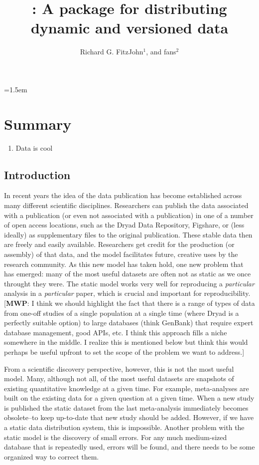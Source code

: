 \documentclass[a4paper,11pt]{article}
\title{{\livingdata}: A package for distributing dynamic and versioned
data}
\author{Richard G. FitzJohn$^1$, and fans$^2$}
\affiliation{
$^1$ Somewhere in the UK\\
$^2$ Everywhere else\\

}
\date{}
\begin{document}
\mstitlepage
\noindent
\parindent=1.5em
\addtolength{\parskip}{.3em}
\doublespacing
\linenumbers
\section{Summary}
\begin{enumerate}
\def\labelenumi{\arabic{enumi}.}
\itemsep1pt\parskip0pt
\item Data is cool
\end{enumerate}

\subsection{Introduction}

In recent years the idea of the data publication has become established
across many different scientific disciplines. Researchers can publish
the data associated with a publication (or even not associated with a
publication) in one of a number of open access locations, such as the
Dryad Data Repository, Figshare, or (less ideally) as supplementary
files to the original publication. These stable data then are freely and
easily available. Researchers get credit for the production (or
assembly) of that data, and the model facilitates future, creative uses
by the research community. As this new model has taken hold, one new
problem that has emerged: many of the most useful datasets are often not
as static as we once throught they were. The static model works very
well for reproducing a \emph{particular} analysis in a \emph{particular}
paper, which is crucial and important for reproducibility.
{[}\textbf{MWP}: I think we should highlight the fact that there is a
range of types of data from one-off studies of a single population at a
single time (where Dryad is a perfectly suitable option) to large
databases (think GenBank) that require expert database management, good
APIs, etc. I think this approach fills a niche somewhere in the middle.
I realize this is mentioned below but think this would perhaps be useful
upfront to set the scope of the problem we want to address.{]}

From a scientific discovery perspective, however, this is not the most
useful model. Many, although not all, of the most useful datasets are
snapshots of existing quantitative knowledge at a given time. For
example, meta-analyses are built on the existing data for a given
question at a given time. When a new study is published the static
dataset from the last meta-analysis immediately becomes obsolete--to
keep up-to-date that new study should be added. However, if we have a
static data distribution system, this is impossible. Another problem
with the static model is the discovery of small errors. For any much
medium-sized database that is repeatedly used, errors will be found, and
there needs to be some organized way to correct them.
\end{document}
